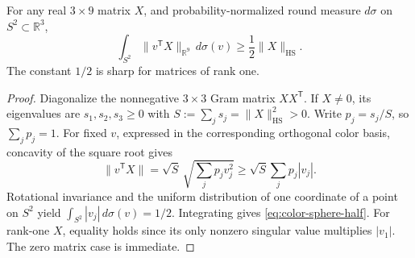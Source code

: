 \begin{proposition}\label{prop:color-sphere-half}
For any real $3\times9$ matrix $X$, and probability-normalized
round measure $d\sigma$ on $S^2\subset\mathbb R^3$,
\begin{equation}\label{eq:color-sphere-half}
 \int_{S^2}\|v^{\mathsf T}X\|_{\mathbb R^9}\,d\sigma(v)
 \ge \frac12\|X\|_{\mathrm{HS}}.
\end{equation}
The constant $1/2$ is sharp for matrices of rank one.
\end{proposition}
\begin{proof}
Diagonalize the nonnegative $3\times3$ Gram matrix
$XX^{\mathsf T}$. If $X\ne0$, its eigenvalues are
$s_1,s_2,s_3\ge0$ with $S:=\sum_j s_j=\|X\|_{\mathrm{HS}}^2>0$.
Write $p_j=s_j/S$, so $\sum_jp_j=1$. For fixed $v$, expressed
in the corresponding orthogonal color basis, concavity of
the square root gives
\[
 \|v^{\mathsf T}X\|=\sqrt{S}\,
       \sqrt{\sum_jp_jv_j^2}
 \ge \sqrt{S}\sum_jp_j|v_j|.
\]
Rotational invariance and the uniform distribution of one
coordinate of a point on $S^2$ yield
$\int_{S^2}|v_j|\,d\sigma(v)=1/2$.
Integrating gives \eqref{eq:color-sphere-half}.
For rank-one $X$, equality holds since its only nonzero
singular value multiplies $|v_1|$. The zero matrix case
is immediate.
\end{proof}

